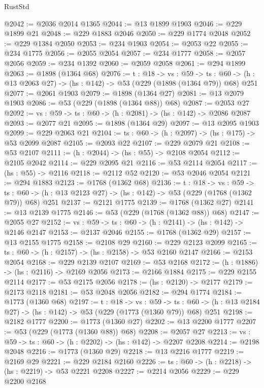 \begin{lexlean}{RustStd}
\begin{coremodule}
@2042 := @2036 @2014 @1365
@2044 := @13 @1899 @1903
@2046 := @229 @1899 @21
@2048 := @229 @1883 @2046
@2050 := @229 @1774 @2048
@2052 := @229 @1384 @2050
@2053 := @234 @1903
@2054 := @2053 @22
@2055 := @234 @1775
@2056 := @2055 @2054
@2057 := @234 @1777
@2058 := @2057 @2056
@2059 := @234 @1392
@2060 := @2059 @2058
@2061 := @294 @1899
@2063 := @1898 (@1364 @68)
@2076 := {t : @18} ->
  {vs : @59} ->
  {ts : @60} -> (h : @13 @2063 @27) -> (hs : @142) -> @53 (@229 (@1898 (@1364 @79)) @68) @251
@2077 := @2061 @1903
@2079 := @1898 (@1364 @27)
@2081 := @13 @2079 @1903
@2086 := @53 (@229 (@1898 (@1364 @88)) @68)
@2087 := @2053 @27
@2092 := {vs : @59} -> {ts : @60} -> (h : @2081) -> (hs : @142) -> @2086 @2087
@2093 := @2077 @21
@2095 := @1898 (@1364 @29)
@2097 := @13 @2095 @1903
@2099 := @229 @2063 @21
@2104 := {ts : @60} -> (h : @2097) -> (hs : @175) -> @53 @2099 @2087
@2105 := @2093 @22
@2107 := @229 @2079 @21
@2108 := @53 @2107
@2111 := (h : @2044) -> (hs : @55) -> @2108 @2054
@2112 := @2105 @2042
@2114 := @229 @2095 @21
@2116 := @53 @2114 @2054
@2117 := (hs : @55) -> @2116
@2118 := @2112 @52
@2120 := @53 @2046 @2054
@2121 := @294 @1883
@2123 := @1768 (@1362 @68)
@2136 := {t : @18} ->
  {vs : @59} ->
  {ts : @60} -> (h : @13 @2123 @27) -> (hs : @142) -> @53 (@229 (@1768 (@1362 @79)) @68) @251
@2137 := @2121 @1775
@2139 := @1768 (@1362 @27)
@2141 := @13 @2139 @1775
@2146 := @53 (@229 (@1768 (@1362 @88)) @68)
@2147 := @2055 @27
@2152 := {vs : @59} -> {ts : @60} -> (h : @2141) -> (hs : @142) -> @2146 @2147
@2153 := @2137 @2046
@2155 := @1768 (@1362 @29)
@2157 := @13 @2155 @1775
@2158 := @2108 @29
@2160 := @229 @2123 @2099
@2165 := {ts : @60} -> (h : @2157) -> (hs : @2158) -> @53 @2160 @2147
@2166 := @2153 @2054
@2168 := @229 @2139 @2107
@2169 := @53 @2168
@2172 := (h : @1886) -> (hs : @2116) -> @2169 @2056
@2173 := @2166 @1884
@2175 := @229 @2155 @2114
@2177 := @53 @2175 @2056
@2178 := (hs : @2120) -> @2177
@2179 := @2173 @2118
@2181 := @53 @2048 @2056
@2182 := @294 @1774
@2184 := @1773 (@1360 @68)
@2197 := {t : @18} ->
  {vs : @59} ->
  {ts : @60} -> (h : @13 @2184 @27) -> (hs : @142) -> @53 (@229 (@1773 (@1360 @79)) @68) @251
@2198 := @2182 @1777
@2200 := @1773 (@1360 @27)
@2202 := @13 @2200 @1777
@2207 := @53 (@229 (@1773 (@1360 @88)) @68)
@2208 := @2057 @27
@2213 := {vs : @59} -> {ts : @60} -> (h : @2202) -> (hs : @142) -> @2207 @2208
@2214 := @2198 @2048
@2216 := @1773 (@1360 @29)
@2218 := @13 @2216 @1777
@2219 := @2169 @29
@2221 := @229 @2184 @2160
@2226 := {ts : @60} -> (h : @2218) -> (hs : @2219) -> @53 @2221 @2208
@2227 := @2214 @2056
@2229 := @229 @2200 @2168

\end{coremodule}
\end{lexlean}
